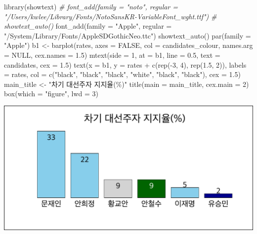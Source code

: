 \documentclass[
]{article}
\newenvironment{Shaded}{}{}
\newcommand{\AttributeTok}[1]{\textcolor[rgb]{0.49,0.56,0.16}{#1}}
\newcommand{\CommentTok}[1]{\textcolor[rgb]{0.38,0.63,0.69}{\textit{#1}}}
\newcommand{\ConstantTok}[1]{\textcolor[rgb]{0.53,0.00,0.00}{#1}}
\newcommand{\DecValTok}[1]{\textcolor[rgb]{0.25,0.63,0.44}{#1}}
\newcommand{\FloatTok}[1]{\textcolor[rgb]{0.25,0.63,0.44}{#1}}
\newcommand{\FunctionTok}[1]{\textcolor[rgb]{0.02,0.16,0.49}{#1}}
\newcommand{\NormalTok}[1]{#1}
\newcommand{\OtherTok}[1]{\textcolor[rgb]{0.00,0.44,0.13}{#1}}
\newcommand{\SpecialCharTok}[1]{\textcolor[rgb]{0.25,0.44,0.63}{#1}}
\newcommand{\StringTok}[1]{\textcolor[rgb]{0.25,0.44,0.63}{#1}}
\begin{document}
\begin{Shaded}
\begin{Highlighting}[]
\FunctionTok{library}\NormalTok{(showtext)}
\CommentTok{\# font\_add(family = "noto", regular = "/Users/kwlee/Library/Fonts/NotoSansKR{-}VariableFont\_wght.ttf")}
\CommentTok{\# showtext\_auto()}
\FunctionTok{font\_add}\NormalTok{(}\AttributeTok{family =} \StringTok{"Apple"}\NormalTok{, }\AttributeTok{regular =} \StringTok{"/System/Library/Fonts/AppleSDGothicNeo.ttc"}\NormalTok{)}
\FunctionTok{showtext\_auto}\NormalTok{()}
\FunctionTok{par}\NormalTok{(}\AttributeTok{family =} \StringTok{"Apple"}\NormalTok{)}
\NormalTok{b1 }\OtherTok{\textless{}{-}} \FunctionTok{barplot}\NormalTok{(rates, }
              \AttributeTok{axes =} \ConstantTok{FALSE}\NormalTok{, }
              \AttributeTok{col =}\NormalTok{ candidates\_colour, }
              \AttributeTok{names.arg =} \ConstantTok{NULL}\NormalTok{,}
              \AttributeTok{cex.names =} \FloatTok{1.5}\NormalTok{)}
\FunctionTok{mtext}\NormalTok{(}\AttributeTok{side =} \DecValTok{1}\NormalTok{, }\AttributeTok{at =}\NormalTok{ b1, }\AttributeTok{line =} \FloatTok{0.5}\NormalTok{, }\AttributeTok{text =}\NormalTok{ candidates, }\AttributeTok{cex =} \FloatTok{1.5}\NormalTok{)}
\FunctionTok{text}\NormalTok{(}\AttributeTok{x =}\NormalTok{ b1, }\AttributeTok{y =}\NormalTok{ rates }\SpecialCharTok{+} \FunctionTok{c}\NormalTok{(}\FunctionTok{rep}\NormalTok{(}\SpecialCharTok{{-}}\DecValTok{3}\NormalTok{, }\DecValTok{4}\NormalTok{), }\FunctionTok{rep}\NormalTok{(}\FloatTok{1.5}\NormalTok{, }\DecValTok{2}\NormalTok{)), }
     \AttributeTok{labels =}\NormalTok{ rates, }
     \AttributeTok{col =} \FunctionTok{c}\NormalTok{(}\StringTok{"black"}\NormalTok{, }\StringTok{"black"}\NormalTok{, }\StringTok{"black"}\NormalTok{, }\StringTok{"white"}\NormalTok{, }\StringTok{"black"}\NormalTok{, }\StringTok{"black"}\NormalTok{),}
     \AttributeTok{cex =} \FloatTok{1.5}\NormalTok{)}
\NormalTok{main\_title }\OtherTok{\textless{}{-}} \StringTok{"차기 대선주자 지지율(\%)"}
\FunctionTok{title}\NormalTok{(}\AttributeTok{main =}\NormalTok{ main\_title, }
      \AttributeTok{cex.main =} \DecValTok{2}\NormalTok{)}
\FunctionTok{box}\NormalTok{(}\AttributeTok{which =} \StringTok{"figure"}\NormalTok{, }\AttributeTok{lwd =} \DecValTok{3}\NormalTok{)}
\end{Highlighting}
\end{Shaded}

\includegraphics{poll_JTBC_1702_pdf_files/figure-latex/unnamed-chunk-3-1.pdf}
\end{document}
